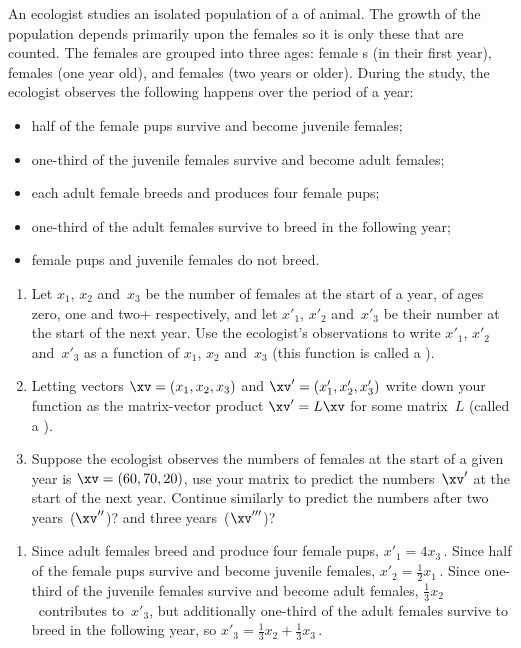 \begin{example} \label{eg:matasp}
An ecologist studies an isolated population of a  of animal.
The growth of the population depends primarily upon the females so it is only these that are counted.
The females are grouped into three ages: female s (in their first year),  females (one year old), and  females (two years or older).
During the study, the ecologist observes the following happens over the period of a year:
\begin{itemize}
\item  half of the female pups survive and become juvenile females;
\item  one-third of the juvenile females survive and become adult females;
\item  each adult female breeds and produces four female pups;
\item  one-third of the adult females survive to breed in the following year;
\item  female pups and juvenile females do not breed.
\end{itemize}
\begin{enumerate}
\item Let \(x_1\), \(x_2\) and~\(x_3\) be the number of females at the start of a year, of ages zero, one and two+ respectively, and let \(x'_1\), \(x'_2\) and~\(x'_3\) be their number at the start of the next year.
Use the ecologist's observations to write \(x'_1\), \(x'_2\) and~\(x'_3\) as a function of \(x_1\), \(x_2\) and~\(x_3\)  (this function is called a ).
\item Letting vectors \(\xv=(x_1,x_2,x_3)\) and \(\xv'=(x'_1,x'_2,x'_3)\) write down your function as the matrix-vector product \(\xv'=L\xv\) for some matrix~\(L\) (called a ).
\item Suppose the ecologist observes the numbers of females at the start of a given year is \(\xv=(60,70,20)\), use your matrix to predict the numbers~\(\xv'\) at the start of the next year.  
Continue similarly to predict the numbers after two years~(\(\xv''\))? and three years~(\(\xv'''\))?
\end{enumerate}

\begin{solution} 
\begin{enumerate}
\item Since adult females breed and produce four female pups, \(x'_1=4x_3\)\,.
Since half of the female pups survive and become juvenile females, \(x'_2=\frac12x_1\)\,.
Since one-third of the juvenile females survive and become adult females, \(\frac13x_2\)~contributes to~\(x'_3\), but additionally one-third of the adult females survive to breed in the following year, so  \(x'_3=\frac13x_2+\frac13x_3\)\,.


\end{enumerate}
\end{solution}
\end{example}
